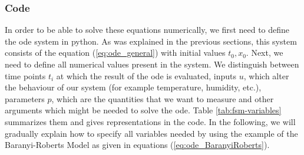 \documentclass[10pt,A4paper]{article}
\begin{document}
\subsubsection*{Code}
In order to be able to solve these equations numerically, we first need to define the \ac{ode} system in python.
As was explained in the previous sections, this system consists of the equation (\ref{eq:ode_general}) with initial values $t_0,x_0$.
Next, we need to define all numerical values present in the system.
We distinguish between time points $t_i$ at which the result of the \ac{ode} is evaluated, inputs $u$, which alter the behaviour of our system (for example temperature, humidity, etc.), parameters $p$, which are the quantities that we want to measure and other arguments which might be needed to solve the \ac{ode}.
Table \ref{tab:fsm-variables} summarizes them and gives representations in the code.
In the following, we will gradually explain how to specify all variables needed by using the example of the Baranyi-Roberts Model as given in equations (\ref{eq:ode_BaranyiRoberts}).
\end{document}
